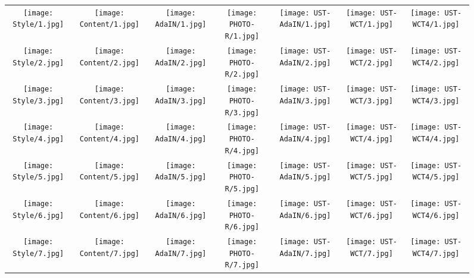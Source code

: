 \documentclass{llncs}
\begin{document}
\begin{figure}[!ht]
   \centering
\begin{tabular}{ccccccc}

\texttt{[image: Style/1.jpg]}&
\texttt{[image: Content/1.jpg]}&
\texttt{[image: AdaIN/1.jpg]}&
\texttt{[image: PHOTO-R/1.jpg]}&
\texttt{[image: UST-AdaIN/1.jpg]}&
\texttt{[image: UST-WCT/1.jpg]}&
\texttt{[image: UST-WCT4/1.jpg]}\\

\texttt{[image: Style/2.jpg]}&
\texttt{[image: Content/2.jpg]}&
\texttt{[image: AdaIN/2.jpg]}&
\texttt{[image: PHOTO-R/2.jpg]}&
\texttt{[image: UST-AdaIN/2.jpg]}&
\texttt{[image: UST-WCT/2.jpg]}&
\texttt{[image: UST-WCT4/2.jpg]}\\

\texttt{[image: Style/3.jpg]}&
\texttt{[image: Content/3.jpg]}&
\texttt{[image: AdaIN/3.jpg]}&
\texttt{[image: PHOTO-R/3.jpg]}&
\texttt{[image: UST-AdaIN/3.jpg]}&
\texttt{[image: UST-WCT/3.jpg]}&
\texttt{[image: UST-WCT4/3.jpg]}\\

\texttt{[image: Style/4.jpg]}&
\texttt{[image: Content/4.jpg]}&
\texttt{[image: AdaIN/4.jpg]}&
\texttt{[image: PHOTO-R/4.jpg]}&
\texttt{[image: UST-AdaIN/4.jpg]}&
\texttt{[image: UST-WCT/4.jpg]}&
\texttt{[image: UST-WCT4/4.jpg]}\\

\texttt{[image: Style/5.jpg]}&
\texttt{[image: Content/5.jpg]}&
\texttt{[image: AdaIN/5.jpg]}&
\texttt{[image: PHOTO-R/5.jpg]}&
\texttt{[image: UST-AdaIN/5.jpg]}&
\texttt{[image: UST-WCT/5.jpg]}&
\texttt{[image: UST-WCT4/5.jpg]}\\

\texttt{[image: Style/6.jpg]}&
\texttt{[image: Content/6.jpg]}&
\texttt{[image: AdaIN/6.jpg]}&
\texttt{[image: PHOTO-R/6.jpg]}&
\texttt{[image: UST-AdaIN/6.jpg]}&
\texttt{[image: UST-WCT/6.jpg]}&
\texttt{[image: UST-WCT4/6.jpg]}\\

\texttt{[image: Style/7.jpg]}&
\texttt{[image: Content/7.jpg]}&
\texttt{[image: AdaIN/7.jpg]}&
\texttt{[image: PHOTO-R/7.jpg]}&
\texttt{[image: UST-AdaIN/7.jpg]}&
\texttt{[image: UST-WCT/7.jpg]}&
\texttt{[image: UST-WCT4/7.jpg]}\\


\end{tabular}
\end{figure}
\end{document}
